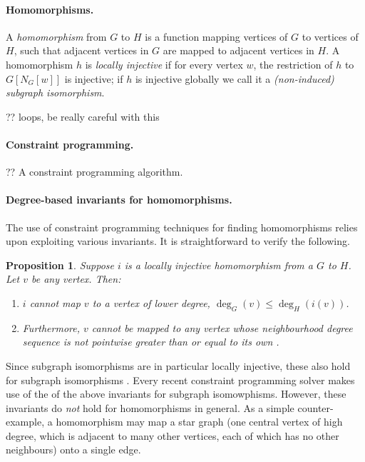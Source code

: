 \documentclass{article}
\newtheorem{proposition}{Proposition}
\newcommand{\degree}{\operatorname{deg}}
\begin{document}
\paragraph{Homomorphisms.} A \emph{homomorphism} from $G$ to $H$ is a function mapping vertices of
$G$ to vertices of $H$, such that adjacent vertices in $G$ are mapped to adjacent vertices in $H$. A
homomorphism $h$ is \emph{locally injective} if for every vertex $w$, the restriction of $h$ to
$G[N_G[w]]$ is injective; if $h$ is injective globally we call it a \emph{(non-induced) subgraph
isomorphism}.

?? loops, be really careful with this

\paragraph{Constraint programming.} ?? A constraint programming algorithm.

\paragraph{Degree-based invariants for homomorphisms.} The use of constraint programming techniques
for finding homomorphisms relies upon exploiting various invariants. It is straightforward to verify the following.

\begin{proposition}\label{proposition:degreends}
    Suppose  $i$ is a locally injective homomorphism from a $G$ to  $H$. Let
    $v$ be any vertex. Then:
    \begin{enumerate}
        \item $i$ cannot map $v$ to a vertex of lower degree, $\degree_G(v) \le \degree_H(i(v))$.
        \item Furthermore, $v$ cannot be mapped to any vertex whose neighbourhood degree sequence is
            not pointwise greater than or equal to its own
           .
    \end{enumerate}
\end{proposition}
Since subgraph isomorphisms are in particular locally injective, these also hold for subgraph isomorphisms \cite{DBLP:journals/constraints/ZampelliDS10}.
Every recent
constraint programming solver makes use of the of the above invariants for subgraph isomowphisms.
However, these invariants do \emph{not} hold for homomorphisms in general. As a simple counter-example, a
homomorphism may map a star graph (one central vertex of high degree, which is adjacent to many
other vertices, each of which has no other neighbours) onto a single edge.
\end{document}
